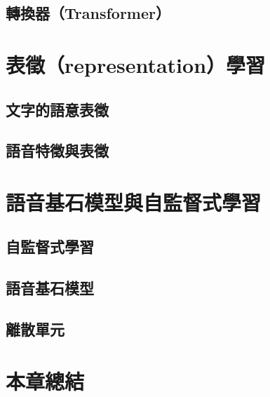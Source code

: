 \subsection{轉換器（Transformer）}



\section{表徵（representation）學習}


\subsection{文字的語意表徵}

\subsection{語音特徵與表徵}

\section{語音基石模型與自監督式學習}

\subsection{自監督式學習}

\subsection{語音基石模型}

\subsection{離散單元}

\section{本章總結}
